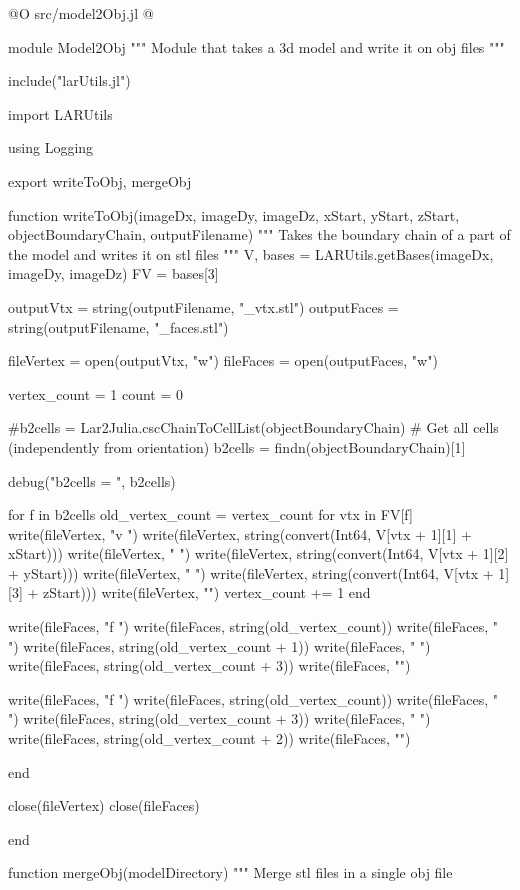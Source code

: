 \documentclass[11pt,oneside]{article}	%
\begin{document}
@O src/model2Obj.jl
@{module Model2Obj
"""
Module that takes a 3d model and write it on
obj files
"""

include("larUtils.jl")

import LARUtils

using Logging

export writeToObj, mergeObj

function writeToObj(imageDx, imageDy, imageDz,
                    xStart, yStart, zStart,
                    objectBoundaryChain, outputFilename)
  """
  Takes the boundary chain of a part of the model
  and writes it on stl files
  """
  V, bases = LARUtils.getBases(imageDx, imageDy, imageDz)
  FV = bases[3]

  outputVtx = string(outputFilename, "_vtx.stl")
  outputFaces = string(outputFilename, "_faces.stl")

  fileVertex = open(outputVtx, "w")
  fileFaces = open(outputFaces, "w")

  vertex_count = 1
  count = 0

  #b2cells = Lar2Julia.cscChainToCellList(objectBoundaryChain)
  # Get all cells (independently from orientation)
  b2cells = findn(objectBoundaryChain)[1]

  debug("b2cells = ", b2cells)

  for f in b2cells
    old_vertex_count = vertex_count
    for vtx in FV[f]
      write(fileVertex, "v ")
      write(fileVertex, string(convert(Int64, V[vtx + 1][1] + xStart)))
      write(fileVertex, " ")
      write(fileVertex, string(convert(Int64, V[vtx + 1][2] + yStart)))
      write(fileVertex, " ")
      write(fileVertex, string(convert(Int64, V[vtx + 1][3] + zStart)))
      write(fileVertex, "\n")
      vertex_count += 1
    end

    write(fileFaces, "f ")
    write(fileFaces, string(old_vertex_count))
    write(fileFaces, " ")
    write(fileFaces, string(old_vertex_count + 1))
    write(fileFaces, " ")
    write(fileFaces, string(old_vertex_count + 3))
    write(fileFaces, "\n")

    write(fileFaces, "f ")
    write(fileFaces, string(old_vertex_count))
    write(fileFaces, " ")
    write(fileFaces, string(old_vertex_count + 3))
    write(fileFaces, " ")
    write(fileFaces, string(old_vertex_count + 2))
    write(fileFaces, "\n")

  end

  close(fileVertex)
  close(fileFaces)

end

function mergeObj(modelDirectory)
  """
  Merge stl files in a single obj file

}
\end{document}
